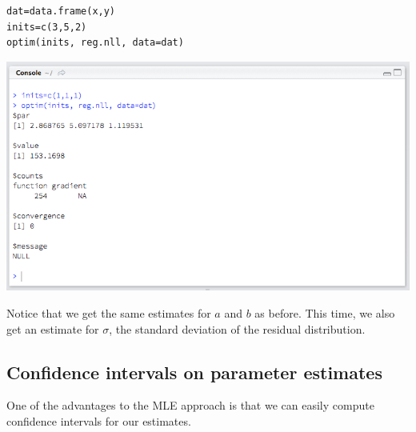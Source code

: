 \documentclass[11pt]{article}
\begin{document}
\begin{verbatim}
dat=data.frame(x,y)
inits=c(3,5,2)
optim(inits, reg.nll, data=dat)
\end{verbatim}

\includegraphics[width=.9\linewidth]{figures/week7/mle.png}

Notice that we get the same estimates for $a$ and $b$ as before.  This time, we also get an estimate for $\sigma$, the standard deviation of the residual distribution.

\subsection*{Confidence intervals on parameter estimates}
\label{sec-6-1}

One of the advantages to the MLE approach is that we can easily compute confidence intervals for our estimates.  
\end{document}
